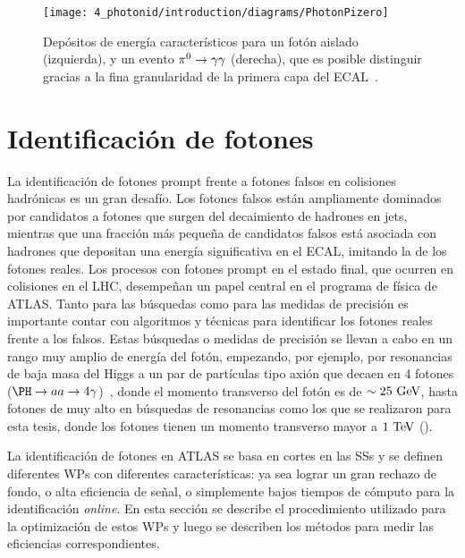 \begin{figure}[ht!]
    \centering
    \texttt{[image: 4\_photonid/introduction/diagrams/PhotonPizero]}
    \caption{Dep\'ositos de energ\'ia caracter\'isticos para un fot\'on aislado (izquierda), y un evento \(\pi^{0}\rightarrow\gamma\gamma\) (derecha), que es posible distinguir gracias a la fina granularidad de la primera capa del \ac{ECAL}~\cite{ATLAS-ECAL-Pizero}.}
    \label{fig:pid_ss:ss:pizero}
\end{figure}






\section{Identificaci\'on de fotones}
\label{sec:pid_ss:pid}

La identificación de fotones prompt frente a fotones falsos en colisiones hadrónicas es un gran desaf\'io. Los fotones falsos están ampliamente dominados por candidatos a fotones que surgen del decaimiento de hadrones en jets, mientras que una fracción más pequeña de candidatos falsos está asociada con hadrones que depositan una energía significativa en el \ac{ECAL}, imitando la de los fotones reales.
Los procesos con fotones prompt en el estado final, que ocurren en colisiones \pp en el \ac{LHC}, desempeñan un papel central en el programa de física de \ac{ATLAS}. Tanto para las búsquedas como para las medidas de precisión es importante contar con algoritmos y técnicas para identificar los fotones reales frente a los falsos. Estas b\'usquedas o medidas de precisi\'on se llevan a cabo en un rango muy amplio de energ\'ia del fotón, empezando, por ejemplo, por resonancias de baja masa del Higgs a un par de partículas tipo axión que decaen en 4 fotones (\(\PH\to aa \to 4\gamma\))~\cite{ATLAS-HiggsTo4Gamma}, donde el momento transverso del fotón es de \(\sim 25~\text{GeV}\), hasta fotones de muy alto \pt en búsquedas de resonancias \gammajet como los que se realizaron para esta tesis, donde los fotones tienen un momento transverso mayor a \(1~\text{TeV}\) (\Part{\ref{part:search}}).

La identificaci\'on de fotones en \ac{ATLAS} se basa en cortes en las \acp{SS} y se definen diferentes \acfp{WP} con diferentes caracter\'isticas: ya sea lograr un gran rechazo de fondo, o alta eficiencia de se\~nal, o simplemente bajos tiempos de c\'omputo para la identificaci\'on \textit{online}. En esta sección se describe el procedimiento utilizado para la optimizaci\'on de estos \acp{WP} y luego se describen los m\'etodos para medir las eficiencias correspondientes.



